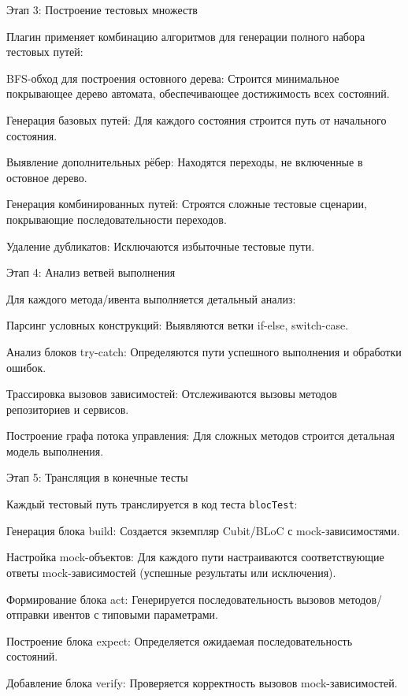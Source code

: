 \documentclass[14pt, russian]{scrartcl}
\begin{document}
Этап 3: Построение тестовых множеств

Плагин применяет комбинацию алгоритмов для генерации полного набора тестовых путей:
\begin{itemize*}
    \item BFS-обход для построения остовного дерева: Строится минимальное покрывающее дерево автомата, обеспечивающее достижимость всех состояний.
    \item Генерация базовых путей: Для каждого состояния строится путь от начального состояния.
    \item Выявление дополнительных рёбер: Находятся переходы, не включенные в остовное дерево.
    \item Генерация комбинированных путей: Строятся сложные тестовые сценарии, покрывающие последовательности переходов.
    \item Удаление дубликатов: Исключаются избыточные тестовые пути.
\end{itemize*}

Этап 4: Анализ ветвей выполнения

Для каждого метода/ивента выполняется детальный анализ:
\begin{itemize*}
    \item Парсинг условных конструкций: Выявляются ветки if-else, switch-case.
    \item Анализ блоков try-catch: Определяются пути успешного выполнения и обработки ошибок.
    \item Трассировка вызовов зависимостей: Отслеживаются вызовы методов репозиториев и сервисов.
    \item Построение графа потока управления: Для сложных методов строится детальная модель выполнения.
\end{itemize*}

Этап 5: Трансляция в конечные тесты

Каждый тестовый путь транслируется в код теста \texttt{blocTest}:
\begin{itemize*}
    \item Генерация блока build: Создается экземпляр Cubit/BLoC с mock-зависимостями.
    \item Настройка mock-объектов: Для каждого пути настраиваются соответствующие ответы mock-зависимостей (успешные результаты или исключения).
    \item Формирование блока act: Генерируется последовательность вызовов методов/отправки ивентов с типовыми параметрами.
    \item Построение блока expect: Определяется ожидаемая последовательность состояний.
    \item Добавление блока verify: Проверяется корректность вызовов mock-зависимостей.
\end{itemize*}
\end{document}
